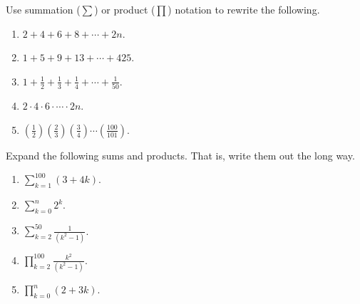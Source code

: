 \documentclass[11pt,]{book}
\theoremstyle{ptxplainnotitle}
\theoremstyle{ptxplaintitle}
\theoremstyle{ptxdefinitionnotitle}
\theoremstyle{ptxdefinitiontitle}
\theoremstyle{ptxdefinitionnotitle}
\theoremstyle{ptxdefinitiontitle}
\theoremstyle{ptxdefinitionnotitle}
\theoremstyle{ptxdefinitiontitle}
\theoremstyle{ptxdefinitiontitlenonumber}
\theoremstyle{ptxdefinitiontitlenonumber}
\numberwithin{equation}{chapter}
\renewcommand{\d}{\displaystyle}
\begin{document}
\begin{divisionexercise}{14}\hypertarget{exercise-26}{}
\hypertarget{p-343}{}%
Use summation (\(\sum\)) or product (\(\prod\)) notation to rewrite the following.%
\par
\hypertarget{p-344}{}%
\leavevmode%
\begin{enumerate}[label=(\alph*)]
\item\hypertarget{li-179}{}\(2 + 4 + 6 + 8 + \cdots + 2n\).%
\item\hypertarget{li-180}{}\(1 + 5 + 9 + 13 + \cdots + 425\).%
\item\hypertarget{li-181}{}\(1 + \frac{1}{2} + \frac{1}{3} + \frac{1}{4} + \cdots + \frac{1}{50}\).%
\item\hypertarget{li-182}{}\(2 \cdot 4 \cdot 6 \cdot \cdots \cdot 2n\).%
\item\hypertarget{li-183}{}\((\frac{1}{2})(\frac{2}{3})(\frac{3}{4})\cdots(\frac{100}{101})\).%
\end{enumerate}
%
\end{divisionexercise}%
\begin{divisionexercise}{15}\hypertarget{exercise-27}{}
\hypertarget{p-346}{}%
Expand the following sums and products. That is, write them out the long way.%
\par
\hypertarget{p-347}{}%
\leavevmode%
\begin{enumerate}[label=(\alph*)]
\item\hypertarget{li-189}{}\(\d\sum_{k=1}^{100} (3+4k)\).%
\item\hypertarget{li-190}{}\(\d\sum_{k=0}^n 2^k\).%
\item\hypertarget{li-191}{}\(\d\sum_{k=2}^{50}\frac{1}{(k^2 - 1)}\).%
\item\hypertarget{li-192}{}\(\d\prod_{k=2}^{100}\frac{k^2}{(k^2-1)}\).%
\item\hypertarget{li-193}{}\(\d\prod_{k=0}^n (2+3k)\).%
\end{enumerate}
%
\end{divisionexercise}%
\end{document}

